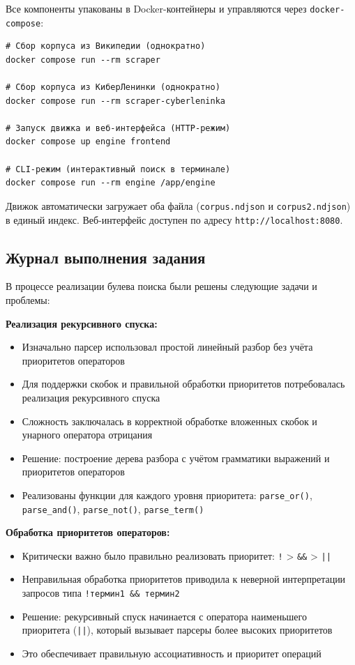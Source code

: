 Все компоненты упакованы в Docker-контейнеры и управляются через \texttt{docker-compose}:

\begin{verbatim}
# Сбор корпуса из Википедии (однократно)
docker compose run --rm scraper

# Сбор корпуса из КиберЛенинки (однократно)
docker compose run --rm scraper-cyberleninka

# Запуск движка и веб-интерфейса (HTTP-режим)
docker compose up engine frontend

# CLI-режим (интерактивный поиск в терминале)
docker compose run --rm engine /app/engine
\end{verbatim}

Движок автоматически загружает оба файла (\texttt{corpus.ndjson} и \texttt{corpus2.ndjson}) в единый индекс. Веб-интерфейс доступен по адресу \texttt{http://localhost:8080}.

\subsection{Журнал выполнения задания}

В процессе реализации булева поиска были решены следующие задачи и проблемы:

\textbf{Реализация рекурсивного спуска:}
\begin{itemize}
    \item Изначально парсер использовал простой линейный разбор без учёта приоритетов операторов
    \item Для поддержки скобок и правильной обработки приоритетов потребовалась реализация рекурсивного спуска
    \item Сложность заключалась в корректной обработке вложенных скобок и унарного оператора отрицания
    \item Решение: построение дерева разбора с учётом грамматики выражений и приоритетов операторов
    \item Реализованы функции для каждого уровня приоритета: \texttt{parse\_or()}, \texttt{parse\_and()}, \texttt{parse\_not()}, \texttt{parse\_term()}
\end{itemize}

\textbf{Обработка приоритетов операторов:}
\begin{itemize}
    \item Критически важно было правильно реализовать приоритет: \texttt{!} > \texttt{\&\&} > \texttt{||}
    \item Неправильная обработка приоритетов приводила к неверной интерпретации запросов типа \texttt{!термин1 \&\& термин2}
    \item Решение: рекурсивный спуск начинается с оператора наименьшего приоритета (\texttt{||}), который вызывает парсеры более высоких приоритетов
    \item Это обеспечивает правильную ассоциативность и приоритет операций
\end{itemize}

